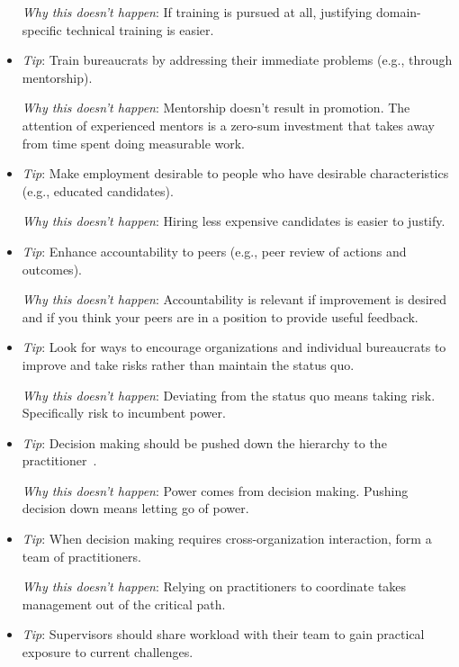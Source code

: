 \begin{itemize}
    \textit{Why this doesn't happen}: If training is pursued at all, justifying domain-specific technical training is easier. 
    
    \item \textit{Tip}: Train bureaucrats by addressing their immediate problems (e.g., through mentorship).

    \textit{Why this doesn't happen}: Mentorship doesn't result in promotion. The attention of experienced mentors is a zero-sum investment that takes away from time spent doing measurable work.
    
    \item \textit{Tip}: Make employment desirable to people who have desirable characteristics (e.g., educated candidates).

    \textit{Why this doesn't happen}: Hiring less expensive candidates is easier to justify. 
    
    \item \textit{Tip}: Enhance accountability to peers (e.g., peer review of actions and outcomes).

    \textit{Why this doesn't happen}: Accountability is relevant if improvement is desired and if you think your peers are in a position to provide useful feedback. 
    
    \item \textit{Tip}: Look for ways to encourage organizations and individual bureaucrats to improve and take risks rather than maintain the status quo.

    \textit{Why this doesn't happen}: Deviating from the status quo means taking risk. Specifically risk to incumbent power. 
    
    \item \textit{Tip}: Decision making should be pushed down the hierarchy to the practitioner~\cite{2013_Marquet}.

    \textit{Why this doesn't happen}: Power comes from decision making. Pushing decision down means letting go of power.
    
    \item \textit{Tip}: When decision making requires cross-organization interaction, form a team of practitioners.

    \textit{Why this doesn't happen}: Relying on practitioners to coordinate takes management out of the critical path. 
    
    \item \textit{Tip}: Supervisors should share workload with their team to gain practical exposure to current challenges.


\end{itemize}
